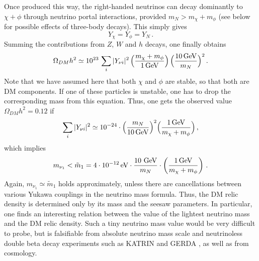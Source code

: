 \documentclass[prd,a4paper,twocolumn,preprintnumbers,nofootinbib,superscriptaddress]{revtex4}
\begin{document}
Once produced this way, the right-handed neutrinos can decay dominantly to $\chi+\phi$ through neutrino portal interactions, provided $m_{N} > m_\chi+m_\phi$ (see below for possible effects of three-body decays). This simply gives
\begin{equation}
	Y_\chi=Y_\phi=Y_{N} \, .
\end{equation}
Summing the contributions from $Z$, $W$ and $h$ decays, one finally obtains
\begin{equation}
	\Omega_{DM} h^2 \simeq
	10^{23} \, \sum_i |Y_{\nu i}|^2\, \Big(\frac{m_\chi+m_\phi}{1\,\hbox{GeV}}\Big)\,\Big(\frac{10\,\hbox{GeV}}{m_N} \Big)^2\,. 
	\label{Omegafreezein}
\end{equation}
Note that we have assumed here that both $\chi$ and $\phi$ are stable, so that both are DM components. If one of these particles is unstable, one has to drop the corresponding mass from this equation. Thus, one gets the observed value $\Omega_{DM}h^2=0.12$ if
\begin{equation}
	\sum_i |Y_{\nu i}|^2\simeq 10^{-24} \cdot \Big( \frac{m_N}{10\,\hbox{GeV}}\Big)^2\Big(\frac{1\,\hbox{GeV}}{m_\chi+m_\phi}\Big) \, , \label{Ynufreezein}
\end{equation}
which implies
\begin{equation} 
	m_{\nu_1}< \tilde{m}_1= 4 \cdot 10^{-12}\,\hbox{eV} \cdot \frac{10 \hbox{ GeV}}{m_{N}}\cdot \left( \frac{1\,\hbox{GeV}}{m_\chi+m_\phi} \right) \,. 
	\label{numass}
\end{equation}
Again, $m_{\nu_1}\simeq \tilde{m}_1$ holds approximately, unless there are cancellations between various Yukawa couplings in the neutrino mass formula.
Thus, the DM relic density is determined only by its mass and the seesaw parameters. In particular, one finds an interesting relation between the value of the lightest neutrino mass and the DM relic density. 
Such a tiny neutrino mass value would be very difficult to probe, but is falsifiable from absolute neutrino mass scale and neutrinoless double beta decay experiments such as KATRIN and GERDA \cite{Ackermann:2012xja}, as well as from cosmology.
	
\end{document}
